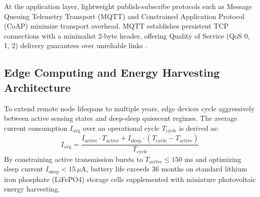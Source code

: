 At the application layer, lightweight publish-subscribe protocols such as Message Queuing Telemetry Transport (MQTT) and Constrained Application Protocol (CoAP) minimize transport overhead. MQTT establishes persistent TCP connections with a minimalist 2-byte header, offering Quality of Service (QoS 0, 1, 2) delivery guarantees over unreliable links \cite{bahga2014internet}.

\subsection{Edge Computing and Energy Harvesting Architecture}
To extend remote node lifespans to multiple years, edge devices cycle aggressively between active sensing states and deep-sleep quiescent regimes. The average current consumption $I_{\text{avg}}$ over an operational cycle $T_{\text{cycle}}$ is derived as:
\begin{equation}
  I_{\text{avg}} = \frac{I_{\text{active}} \cdot T_{\text{active}} + I_{\text{sleep}} \cdot (T_{\text{cycle}} - T_{\text{active}})}{T_{\text{cycle}}}
\end{equation}
By constraining active transmission bursts to $T_{\text{active}} \le 150\text{ ms}$ and optimizing sleep current $I_{\text{sleep}} < 15\,\mu\text{A}$, battery life exceeds 36 months on standard lithium iron phosphate (LiFePO4) storage cells supplemented with miniature photovoltaic energy harvesting.
